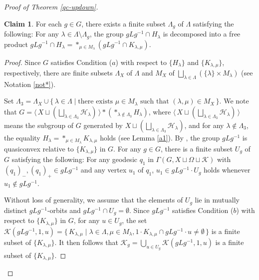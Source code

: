 \documentclass{amsart}
\theoremstyle{definition}
\newtheorem{Claim}[Thm]{Claim}
\begin{document}
\begin{proof}[Proof of Theorem \ref{qc-updown}]
\begin{Claim}\label{claim4}
For each $g\in G$, there exists a finite subset $\Lambda_g$ of $\Lambda$ satisfying the following:
For any $\lambda\in\Lambda\setminus \Lambda_g$, the group $gLg^{-1}\cap H_\lambda$ is decomposed into a free product $gLg^{-1}\cap H_\lambda =\ast_{\mu\in M_\lambda}(gLg^{-1}\cap K_{\lambda,\mu})$. 
\end{Claim}

\begin{proof}
Since $G$ satisfies Condition ($a$) with respect to $\{H_\lambda\}$ and $\{K_{\lambda,\mu}\}$, respectively, there are finite subsets $\Lambda_X$ of $\Lambda$ and $M_X$ of $\bigsqcup_{\lambda\in\Lambda}(\{\lambda\}\times M_\lambda)$ (see Notation \ref{not*}). 

Set $\Lambda_3=\Lambda_X\cup \{\,\lambda\in \Lambda \mid \text{there exists } \mu\in M_\lambda \text{ such that } (\lambda,\mu)\in M_X\,\}$. 
We note that $G=\langle\, X\sqcup\left(\bigsqcup_{\lambda\in\Lambda_3}{\mathcal H}_\lambda\right) \,\rangle\ast \left(\ast_{\lambda\notin\Lambda_3}H_\lambda\right)$, where $\langle\, X\sqcup\left(\bigsqcup_{\lambda\in\Lambda_3}{\mathcal H}_\lambda\right) \,\rangle$ means the subgroup of $G$ generated by $X\sqcup\left(\bigsqcup_{\lambda\in\Lambda_3}{\mathcal H}_\lambda\right)$, and for any $\lambda\notin\Lambda_3$, the equality $H_\lambda=\ast_{\mu\in M_\lambda}K_{\lambda,\mu}$ holds (see Lemma \ref{a1}). 
By \cite[Lemma 4.16 and Theorem 1.4 (i)]{M-O-Y1}, the group $g L g^{-1}$ is quasiconvex relative to $\{K_{\lambda,\mu}\}$ in $G$. 
For any $g \in G$, there is a finite subset $U_g$ of $G$ satisfying the following:
For any geodesic $q_1$ in $\Gamma(G,X \sqcup \Omega \sqcup {\mathcal K})$ with $(q_1)_-, (q_1)_+ \in g L g^{-1}$ and any vertex $u_1$ of $q_1$, $u_1\in gLg^{-1}\cdot U_g$ holds whenever $u_1 \notin g L g^{-1}$. 
 
Without loss of generality, we assume that the elements of $U_g$ lie in mutually distinct $gLg^{-1}$-orbits and $gLg^{-1} \cap U_g =\emptyset$. 
Since $gLg^{-1}$ satisfies Condition ($b$) with respect to $\{K_{\lambda,\mu}\}$ in $G$, for any $u \in U_g$, the set ${\mathscr{K}}(g L g^{-1}, 1, u)=\{\, K_{\lambda,\mu} \mid \lambda \in \Lambda, \mu \in M_{\lambda}, 1 \cdot K_{\lambda,\mu} \cap g L g^{-1} \cdot u \ne \emptyset \,\}$ is a finite subset of $\{K_{\lambda,\mu}\}$. 
It then follows that ${\mathscr{K}}_g = \bigcup_{u \in U_g} {\mathscr{K}}(g L g^{-1}, 1, u)$ is a finite subset of $\{K_{\lambda,\mu}\}$. 


\end{proof}
\end{proof}
\end{document}
